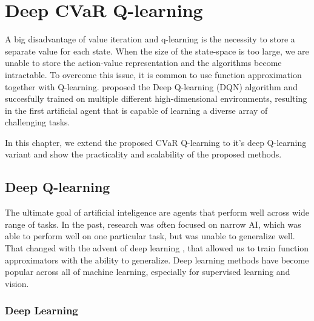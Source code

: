 \chapter{Deep CVaR Q-learning}\label{ch:dqn}

A big disadvantage of value iteration and q-learning is the necessity to store a separate value for each state. When the size of the state-space is too large, we are unable to store the action-value representation and the algorithms become intractable. To overcome this issue, it is common to use function approximation together with Q-learning. \citet{mnih2015human} proposed the Deep Q-learning (DQN) algorithm and succesfully trained on multiple different high-dimensional environments, resulting in the first artificial agent that is capable of learning a diverse array of challenging tasks.

In this chapter, we extend the proposed CVaR Q-learning to it's deep Q-learning variant and show the practicality and scalability of the proposed methods.

\section{Deep Q-learning}
The ultimate goal of artificial inteligence are agents that perform well across wide range of tasks. In the past, research was often focused on narrow AI, which was able to perform well on one particular task, but was unable to generalize well. That changed with the advent of deep learning \cite{neco}, that allowed us to train function approximators with the ability to generalize. Deep learning methods have become popular across all of machine learning, especially for supervised learning and vision.

\subsection{Deep Learning}

